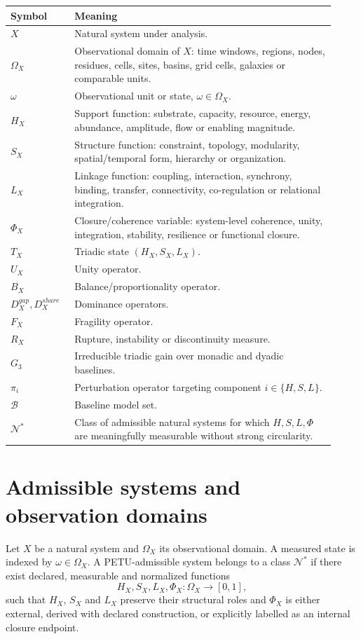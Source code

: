 \documentclass[11pt,a4paper]{article}
\newcommand{\Nstar}{\mathcal{N}^{*}}
\begin{document}
\begin{longtable}{p{0.18\linewidth}p{0.74\linewidth}}
\toprule
\textbf{Symbol} & \textbf{Meaning}\\
\midrule
$X$ & Natural system under analysis.\\
$\Omega_X$ & Observational domain of $X$: time windows, regions, nodes, residues, cells, sites, basins, grid cells, galaxies or comparable units.\\
$\omega$ & Observational unit or state, $\omega\in\Omega_X$.\\
$H_X$ & Support function: substrate, capacity, resource, energy, abundance, amplitude, flow or enabling magnitude.\\
$S_X$ & Structure function: constraint, topology, modularity, spatial/temporal form, hierarchy or organization.\\
$L_X$ & Linkage function: coupling, interaction, synchrony, binding, transfer, connectivity, co-regulation or relational integration.\\
$\Phi_X$ & Closure/coherence variable: system-level coherence, unity, integration, stability, resilience or functional closure.\\
$T_X$ & Triadic state $(H_X,S_X,L_X)$.\\
$U_X$ & Unity operator.\\
$B_X$ & Balance/proportionality operator.\\
$D_X^{gap},D_X^{share}$ & Dominance operators.\\
$F_X$ & Fragility operator.\\
$R_X$ & Rupture, instability or discontinuity measure.\\
$G_3$ & Irreducible triadic gain over monadic and dyadic baselines.\\
$\pi_i$ & Perturbation operator targeting component $i\in\{H,S,L\}$.\\
$\mathcal{B}$ & Baseline model set.\\
$\mathcal{N}^{*}$ & Class of admissible natural systems for which $H,S,L,\Phi$ are meaningfully measurable without strong circularity.\\
\bottomrule
\end{longtable}

\section{Admissible systems and observation domains}

Let $X$ be a natural system and $\Omega_X$ its observational domain.
A measured state is indexed by $\omega\in\Omega_X$.
A PETU-admissible system belongs to a class $\Nstar$ if there exist declared, measurable and normalized functions
\[
H_X,S_X,L_X,\Phi_X:\Omega_X\rightarrow[0,1],
\]
such that $H_X$, $S_X$ and $L_X$ preserve their structural roles and $\Phi_X$ is either external, derived with declared construction, or explicitly labelled as an internal closure endpoint.
\end{document}
